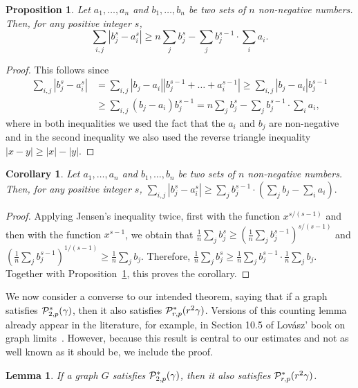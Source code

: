 \documentclass[11pt]{article}
\newtheorem{lemma}{Lemma}[section]
\newtheorem{proposition}{Proposition}[section]
\newtheorem{corollary}{Corollary}[section]
\begin{document}
\begin{proposition}
\label{inequality1}
Let $a_1, \dots, a_n$ and $b_1, \ldots, b_n$ be two sets of $n$ non-negative numbers. Then, for any positive integer $s$,
$$\sum_{i,j} |b_j^s-a_i^s|  \geq n \sum_j b_j^s - \sum_j b_j^{s-1} \cdot\sum_i a_i.$$
\end{proposition}  

\begin{proof}
This follows since
\begin{align*}
\sum_{i,j} |b_j^s - a_i^s| & = \sum_{i,j} |b_j - a_i||b_j^{s-1} + \dots + a_i^{s-1}| \geq \sum_{i,j} |b_j - a_i| b_j^{s-1}\\
& \geq \sum_{i,j} (b_j - a_i) b_j^{s-1} = n \sum_j b_j^s - \sum_j b_j^{s-1} \cdot \sum_i a_i,
\end{align*}
where in both inequalities we used the fact that the $a_i$ and $b_j$ are non-negative and in the second inequality we also used the reverse triangle inequality $|x - y| \geq |x| - |y|$.
\end{proof}

\begin{corollary}
\label{inequality2}
Let $a_1, \dots, a_n$ and $b_1, \ldots, b_n$ be two sets of $n$ non-negative numbers. Then, for any positive integer $s$, $\sum_{i,j} |b_j^s-a_i^s|  \geq  \sum_j b_j^{s-1} \cdot(\sum_j b_j -\sum_i a_i).$
\end{corollary}

\begin{proof}
Applying Jensen's inequality twice, first with the function $x^{s/(s-1)}$ and then with the function
$x^{s-1}$, we obtain that 
$\frac{1}{n}\sum_j b_j^s \geq \left(\frac{1}{n}\sum_j b_j^{s-1}\right)^{s/(s-1)}$ and 
$\left(\frac{1}{n}\sum_j b_j^{s-1}\right)^{1/(s-1)} \geq \frac{1}{n}\sum_j b_j$.
Therefore, $\frac{1}{n}\sum_j b_j^s \geq \frac{1}{n}\sum_j b_j^{s-1} \cdot \frac{1}{n}\sum_j b_j$.
Together with Proposition~\ref{inequality1}, this proves the corollary. 
\end{proof}

We now consider a converse to our intended theorem, saying that if a graph satisfies ${\cal P}^*_{2,p}(\gamma)$, then it also satisfies ${\cal P}^*_{r,p}(r^2 \gamma)$. Versions of this counting lemma already appear in the literature, for example, in Section 10.5 of Lov\'asz' book on graph limits~\cite{Lo}. However, because this result is central to our estimates and not as well known as it should be, we include the proof.

\begin{lemma} \label{lem:counting}
If a graph $G$ satisfies ${\cal P}^*_{2,p}(\gamma)$, then it also satisfies ${\cal P}^*_{r,p}(r^2 \gamma)$.
\end{lemma}
\end{document}
